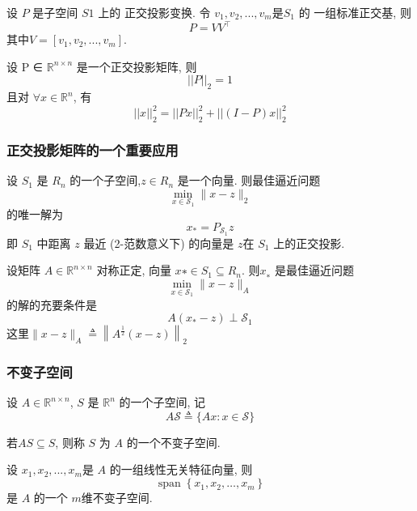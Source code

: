 \documentclass[12pt,a4paper]{article}
\begin{document}
\begin{corollary}
	设 $P$ 是子空间 $S1$ 上的 正交投影变换. 令 $v_1, v_2, . . . , v_m $是$ S_1$ 的
	一组标准正交基, 则
	$$
	P=V V^{\top}
	$$
	其中$ V = [v_1, v_2, . . . , v_m].$
\end{corollary}



\begin{property}
	设 P ∈ $\mathbb{R}^{n×n}$ 是一个正交投影矩阵, 则
	$$
	||P||_{2}=1
	$$
	且对 $∀ x ∈ \mathbb{R}^n$, 有
	$$
	||x||_{2}^{2}=||P x||_{2}^{2}+||(I-P) x||_{2}^{2}
	$$
\end{property}


\subsubsection{正交投影矩阵的一个重要应用}

\begin{theorem}
	设 $S_1$ 是 $R_n$ 的一个子空间,$ z ∈ R_n$ 是一个向量. 则最佳逼近问题
	$$
	\min _{x \in \mathcal{S}_{1}}\|x-z\|_{2}
	$$
	的唯一解为
	$$
	x_{*}=P_{\mathcal{S}_{1}} z
	$$
	即 $S_1$ 中距离 $z$ 最近 (2-范数意义下) 的向量是 $z $在 $S
	_1$ 上的正交投影.
\end{theorem}



\begin{corollary}
	设矩阵 $A ∈ \mathbb{R}^{n×n}$ 对称正定, 向量 $x∗ ∈ S_1 ⊆ R_n.$ 则$ x_∗$ 是最佳逼近问题
	$$
	\min _{x \in \mathcal{S}_{1}}\|x-z\|_{A}
	$$
	的解的充要条件是
	$$
	A\left(x_{*}-z\right) \perp \mathcal{S}_{1}
	$$
	这里$\|x-z\|_{A} \triangleq\left\|A^{\frac{1}{2}}(x-z)\right\|_{2}$
\end{corollary}


\subsubsection{不变子空间}
设 $A ∈ \mathbb{R}^{n×n}$, $S$ 是 $\mathbb{R}^n$ 的一个子空间, 记
$$
A \mathcal{S} \triangleq\{A x : x \in \mathcal{S}\}
$$

\begin{definition}
	若$ AS ⊆ S$, 则称 $S$ 为 $A$ 的一个不变子空间.	
\end{definition}



\begin{theorem}
	设 $x_1, x_2, . . . , x_m $是 $A$ 的一组线性无关特征向量, 则
	$$
	\operatorname{span}\left\{x_{1}, x_{2}, \ldots, x_{m}\right\}
	$$
	是 $A$ 的一个 $m $维不变子空间.
\end{theorem}
\end{document}
